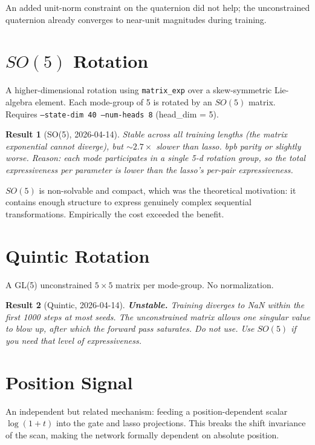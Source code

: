 \documentclass[11pt,openany]{book}
\theoremstyle{definition}
\theoremstyle{plain}
\newtheorem{result}{Result}[chapter]
\begin{document}
An added unit-norm constraint on the quaternion did not help; the
unconstrained quaternion already converges to near-unit magnitudes during
training.

\section{$SO(5)$ Rotation}

A higher-dimensional rotation using \texttt{matrix\_exp} over a
skew-symmetric Lie-algebra element. Each mode-group of 5 is rotated by
an $SO(5)$ matrix. Requires \texttt{--state-dim 40 --num-heads 8}
(head\_dim = 5).

\begin{result}[SO(5), 2026-04-14]
Stable across all training lengths (the matrix exponential cannot
diverge), but $\sim 2.7\times$ slower than lasso. bpb parity or slightly
worse. Reason: each mode participates in a single 5-d rotation group, so
the total expressiveness per parameter is lower than the lasso's per-pair
expressiveness.
\end{result}

$SO(5)$ is non-solvable and compact, which was the theoretical motivation:
it contains enough structure to express genuinely complex sequential
transformations. Empirically the cost exceeded the benefit.

\section{Quintic Rotation}

A GL(5) unconstrained $5 \times 5$ matrix per mode-group. No normalization.

\begin{result}[Quintic, 2026-04-14]
\textbf{Unstable.} Training diverges to NaN within the first 1000 steps
at most seeds. The unconstrained matrix allows one singular value to
blow up, after which the forward pass saturates. \emph{Do not use.}
Use $SO(5)$ if you need that level of expressiveness.
\end{result}

\section{Position Signal}
\label{sec:position-signal}

An independent but related mechanism: feeding a position-dependent
scalar $\log(1+t)$ into the gate and lasso projections. This breaks
the shift invariance of the scan, making the network formally dependent
on absolute position.
\end{document}
